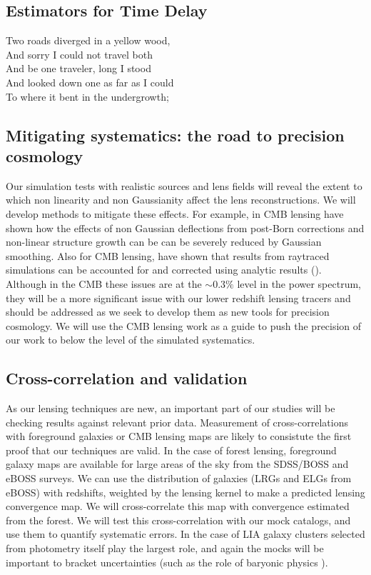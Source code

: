 \subsection{Estimators for Time Delay}

Two roads diverged in a yellow wood,\\
And sorry I could not travel both\\
And be one traveler, long I stood\\
And looked down one as far as I could\\
To where it bent in the undergrowth; \\


\subsection{Mitigating systematics: the road to precision cosmology}

Our simulation tests with realistic sources and lens fields will
reveal the extent to which non linearity and non Gaussianity affect
the lens reconstructions. We will  develop methods to mitigate
these effects. For example, in CMB lensing \cite{lewis16} have shown
how the effects of non Gaussian deflections from post-Born corrections
and non-linear structure growth can be can be severely reduced by
Gaussian smoothing. Also for CMB lensing, \cite{bohm18} have shown
that results from raytraced simulations can be accounted for and
corrected using analytic results (\cite{bohm16}). Although in the CMB
these issues are at the $\sim0.3 \%$ level in the power spectrum, they
will be a more significant issue with our lower redshift lensing
tracers and should be addressed as we seek to develop them as new
tools for precision cosmology. We will use the CMB lensing work as a
guide to push the precision of our work to below the level of the
simulated systematics.

\subsection{Cross-correlation and validation}
As our lensing techniques are new, an important part of our studies will
be checking results against relevant prior data.
Measurement of cross-correlations with foreground galaxies or CMB
lensing maps are likely to consistute the first proof that our
techniques are valid.
 In the case of forest lensing,
foreground galaxy maps are available for large areas of the sky from the
SDSS/BOSS and eBOSS surveys. We can use the distribution of galaxies 
(LRGs and ELGs from eBOSS) with redshifts,
weighted by the lensing kernel to make a predicted lensing
convergence  map. We will
 cross-correlate this map with convergence estimated from the forest. 
We will test this cross-correlation with our mock catalogs, and use
them to quantify systematic errors. In the case of LIA galaxy
clusters selected from photometry itself play the largest role,
and again the mocks will be important to bracket uncertainties 
(such as the role of baryonic physics  \cite{zentner2013}).


